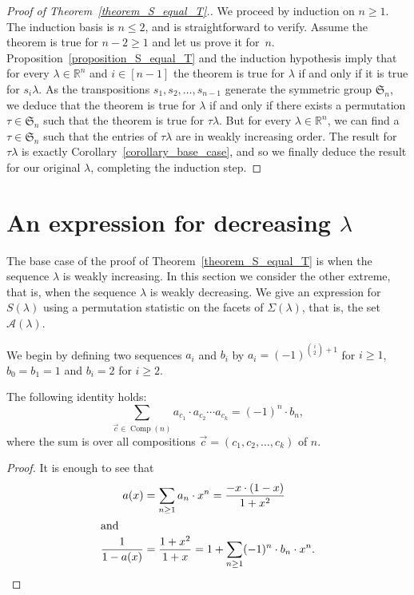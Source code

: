 \documentclass[ALCO,ThmDefs,Unicode,epreuves]{cedram}
\newcommand{\Rrr}{\mathbb{R}}
\newcommand{\Sym}{\mathfrak{S}}
\DeclareMathOperator{\Comp}{Comp}
\begin{document}
\begin{proof}[Proof of Theorem~\ref{theorem_S_equal_T}.]
We proceed by induction on $n \geq 1$.
The induction basis is $n \leq 2$, and is straightforward to verify.
Assume the theorem is true for $n-2 \geq 1$ and let us prove it for~$n$.
Proposition~\ref{proposition_S_equal_T} and the induction hypothesis imply that for
every $\lambda \in \Rrr^{n}$ and $i \in [n-1]$ 
the theorem is true for $\lambda$
if and only if it is true for $s_{i}\lambda$.
As the transpositions $s_{1}, s_{2}, \ldots, s_{n-1}$
generate the symmetric group $\Sym_{n}$, we deduce 
that the theorem is true for
$\lambda$ if and only if there exists 
a permutation $\tau\in\Sym_{n}$ such that the theorem is
true for $\tau\lambda$.
But for every $\lambda \in \Rrr^{n}$, we can find a $\tau \in \Sym_{n}$
such that the entries of $\tau\lambda$ are in weakly increasing order. 
The
result for $\tau\lambda$ is exactly Corollary~\ref{corollary_base_case}, and so we
finally deduce the result for our original $\lambda$,
completing the induction step.
\end{proof}


\section{An expression for decreasing \texorpdfstring{$\lambda$}{lambda}}
\label{section_expression}

The base case of the proof of
Theorem~\ref{theorem_S_equal_T}
is when the sequence $\lambda$ is
weakly increasing. In this section
we consider the other extreme,
that is, when
the sequence $\lambda$ is weakly decreasing.
We give an expression for $S(\lambda)$
using a permutation statistic
on the facets of $\Sigma(\lambda)$,
that is, the set $\mathcal{A}(\lambda)$.


We begin by defining two sequences
$a_{i}$ and $b_{i}$ by
$a_{i}  = (-1)^{\binom{i}{2} + 1}$
for $i \geq 1$,
$b_{0} = b_{1} = 1$ and $b_{i} = 2$ for $i \geq 2$.
\begin{lemma}
The following identity holds:
$$ \sum_{\vec{c} \in \Comp(n)}
a_{c_{1}} \cdot a_{c_{2}} \cdots a_{c_{k}}
=
(-1)^{n} \cdot b_{n} , $$
where the sum is over all compositions
$\vec{c} = (c_{1}, c_{2}, \ldots, c_{k})$
of $n$.
\label{lemma_generating_function_proof}
\end{lemma}
\begin{proof}
It is enough to see that
\begin{align*}
a(x)
& =
\sum_{n \geq 1} a_{n} \cdot x^{n}
=
\frac{-x \cdot (1-x)}{1+x^{2}} \\
\intertext{and}
\frac{1}{1-a(x)}
& =
\frac{1+x^{2}}{1+x}
=
1 + \sum_{n \geq 1} (-1)^{n} \cdot b_{n} \cdot x^{n}.
\qedhere
\end{align*}
\end{proof}
\end{document}
